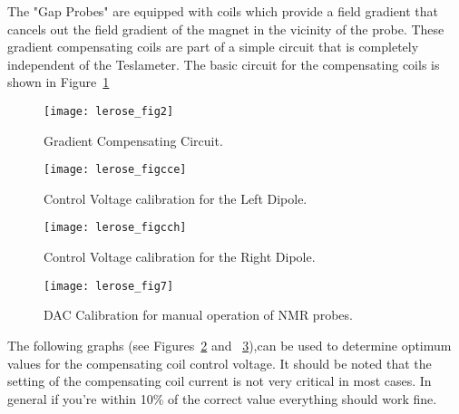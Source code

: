 { The "Gap Probes" are equipped with coils which provide a field 
gradient that cancels out the field gradient of the magnet in the vicinity of 
the probe.  These gradient compensating coils are part of a simple circuit 
that is completely independent of the Teslameter.  The basic circuit for 
the compensating coils is shown in Figure~\ref{fig:nmrcir}


\begin{figure}
\begin{center}
\texttt{[image: lerose\_fig2]}
{\linespread{1.}
\caption[Spectrometers: NMR Gradient Compensation]{Gradient Compensating Circuit.}
\label{fig:nmrcir}}
\end{center}
\end{figure}



\begin{figure}
\begin{center}
\texttt{[image: lerose\_figcce]}
{\linespread{1.}
\caption[Spectrometers: Control Voltage Calibration for Left Dipole]{Control Voltage calibration for the Left Dipole.}
\label{fig:nmrcomp4}}
\end{center}
\end{figure}

\begin{figure}
\begin{center}
\texttt{[image: lerose\_figcch]}
{\linespread{1.}
\caption[Spectrometers: Control Voltage Calibration for Right Dipole] {Control Voltage calibration for the Right Dipole.}
\label{fig:nmrcomp5}}
\end{center}
\end{figure}

\begin{figure}
\begin{center}
\texttt{[image: lerose\_fig7]}
{\linespread{1.}
\caption[Spectrometers: NMR Probe DAC Calibration]{DAC Calibration for manual operation of NMR probes.}
\label{fig:nmr_dac}}
\end{center}
\end{figure}

The following graphs (see Figures~\ref{fig:nmrcomp4} 
and ~\ref{fig:nmrcomp5}),can be used to determine optimum values for the 
compensating coil control voltage.  It should be noted that the setting 
of the compensating coil current is not very critical in most cases.  In 
general if you're within 10\% of the correct value everything should 
work fine.



}
